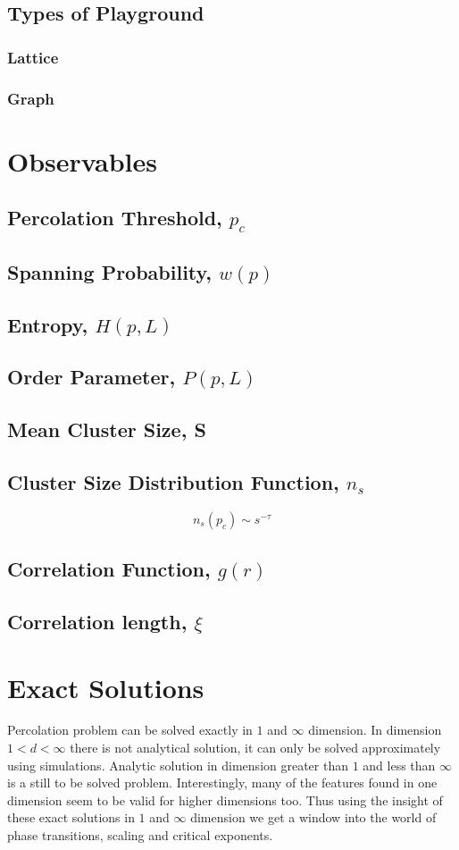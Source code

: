 	\subsection{Types of Playground}
		\subsubsection{Lattice}
		\subsubsection{Graph}
\section{Observables}
	\subsection{Percolation Threshold, $p_c$}
	\subsection{Spanning Probability, $w(p)$}
	\subsection{Entropy, $H(p,L)$}
	\subsection{Order Parameter, $P(p,L)$}
	\subsection{Mean Cluster Size, S}
	\subsection{Cluster Size Distribution Function, $n_s$}
		\begin{equation}
			n_s(p_c)\sim s^{-\tau}
		\end{equation}

	\subsection{Correlation Function, $g(r)$}		
	\subsection{Correlation length, $\xi$}

\section{Exact Solutions}
	Percolation problem can be solved exactly in $1$ and $\infty$ dimension. In dimension $1 < d < \infty$ there is not analytical solution, it can only be solved approximately using simulations. Analytic solution in dimension greater than $1$ and less than $\infty$ is a still to be solved problem. Interestingly, many of the features found in one dimension seem to be valid for higher dimensions too. Thus using the insight of these exact solutions in $1$ and $\infty$ dimension we get a window into the world of phase transitions, scaling and critical exponents.
